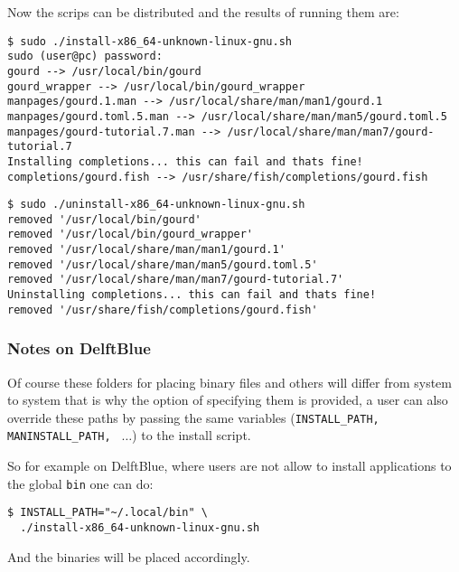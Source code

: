 Now the scrips can be distributed and the results of running them are:

\begin{verbatim}
$ sudo ./install-x86_64-unknown-linux-gnu.sh
sudo (user@pc) password:
gourd --> /usr/local/bin/gourd
gourd_wrapper --> /usr/local/bin/gourd_wrapper
manpages/gourd.1.man --> /usr/local/share/man/man1/gourd.1
manpages/gourd.toml.5.man --> /usr/local/share/man/man5/gourd.toml.5
manpages/gourd-tutorial.7.man --> /usr/local/share/man/man7/gourd-tutorial.7
Installing completions... this can fail and thats fine!
completions/gourd.fish --> /usr/share/fish/completions/gourd.fish
\end{verbatim}

\begin{verbatim}
$ sudo ./uninstall-x86_64-unknown-linux-gnu.sh
removed '/usr/local/bin/gourd'
removed '/usr/local/bin/gourd_wrapper'
removed '/usr/local/share/man/man1/gourd.1'
removed '/usr/local/share/man/man5/gourd.toml.5'
removed '/usr/local/share/man/man7/gourd-tutorial.7'
Uninstalling completions... this can fail and thats fine!
removed '/usr/share/fish/completions/gourd.fish'
\end{verbatim}


\subsubsection{Notes on DelftBlue}
\label{sec:installexample2}

Of course these folders for placing binary files and others will differ from system to system
that is why the option of specifying them is provided, a user can also override these paths by
passing the same variables (\texttt{INSTALL\_PATH, MANINSTALL\_PATH, } $\dots$) to the install script.

So for example on DelftBlue, where users are not allow to install applications
to the global \texttt{bin} one can do:

\begin{verbatim}
$ INSTALL_PATH="~/.local/bin" \
  ./install-x86_64-unknown-linux-gnu.sh
\end{verbatim}

And the binaries will be placed accordingly.
